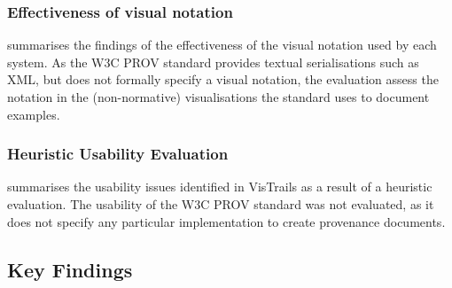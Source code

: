 
\subsubsection{Effectiveness of visual notation}

{}

 summarises the findings of the effectiveness of the visual notation used by each system. As the W3C PROV standard provides textual serialisations such as XML, but does not formally specify a visual notation, the evaluation assess the notation in the (non-normative) visualisations the standard uses to document examples.

{}

\subsubsection{Heuristic Usability Evaluation}

{}

 summarises the usability issues
identified in VisTrails as a result of a heuristic evaluation. The usability of the W3C PROV standard was not evaluated, as it
does not specify any particular implementation to create provenance documents.

{}

\subsection{Key Findings}
\label{sec:provkeyfindings}

